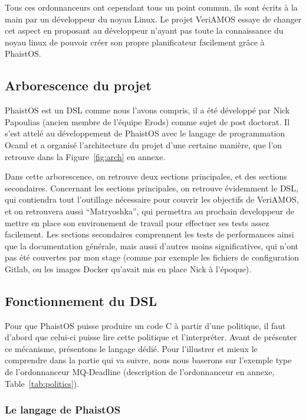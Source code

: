 Tous ces ordonnanceurs ont cependant tous un point commun, ils sont écrits à la 
main par un développeur du noyau Linux. Le projet VeriAMOS essaye de changer 
cet aspect en proposant au développeur n'ayant pas toute la connaissance du 
noyau linux de pouvoir créer son propre planificateur facilement grâce à 
PhaistOS. 

\subsection{Arborescence du projet}

PhaistOS est un DSL comme nous l'avons compris, il a été développé par Nick 
Papoulias (ancien membre de l'équipe Erods) comme sujet de post doctorat. Il 
s'est attelé au développement de PhaistOS avec le langage de programmation 
Ocaml et a organisé l'architecture du projet d'une certaine manière, que l'on 
retrouve dans la Figure~\ref{fig:arch} en annexe.

Dans cette arborescence, on retrouve deux sections principales, et des sections 
secondaires. Concernant les sections principales, on retrouve évidemment le 
DSL, qui contiendra tout l'outillage nécessaire pour couvrir les objectifs de 
VeriAMOS, et on retrouvera aussi ``Matryoshka'', qui permettra au prochain 
developpeur de mettre en place son environement de travail pour effectuer ses 
tests assez facilement. Les sections secondaires comprennent les tests de 
performances ainsi que la documentation générale, mais aussi d'autres moins 
significatives, qui n'ont pas été couvertes par mon stage (comme par exemple 
les fichiers de configuration Gitlab, ou les images Docker qu'avait mis en 
place Nick à l'époque).

\subsection{Fonctionnement du DSL}

Pour que PhaistOS puisse produire un code C à partir d'une politique, il 
faut d'abord que celui-ci puisse lire cette politique et l'interpréter. Avant 
de présenter ce mécanisme, présentons le langage dédié. Pour l'illustrer et 
mieux le comprendre dans la partie qui va suivre, nous nous baserons sur 
l'exemple type de l'ordonnanceur MQ-Deadline (description de l'ordonnanceur en annexe, Table~\ref{tab:politics}).

\subsubsection{Le langage de PhaistOS}
\label{phlang}

